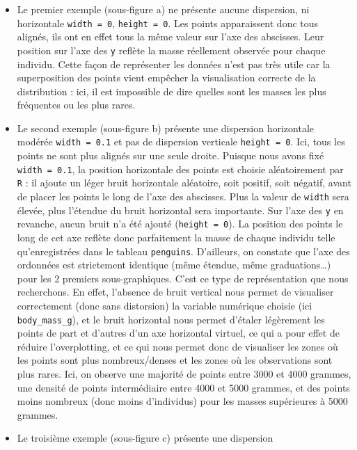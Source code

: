 \documentclass[
  letterpaper,
  DIV=11,
  numbers=noendperiod]{scrreprt}
\begin{document}
\begin{itemize}
\item
  Le premier exemple (sous-figure a) ne présente aucune dispersion, ni
  horizontale \texttt{width\ =\ 0}, \texttt{height\ =\ 0}. Les points
  apparaissent donc tous alignés, ils ont en effet tous la même valeur
  sur l'axe des abscisses. Leur position sur l'axe des \texttt{y}
  reflète la masse réellement observée pour chaque individu. Cette façon
  de représenter les données n'est pas très utile car la superposition
  des points vient empêcher la visualisation correcte de la distribution
  : ici, il est impossible de dire quelles sont les masses les plus
  fréquentes ou les plus rares.
\item
  Le second exemple (sous-figure b) présente une dispersion horizontale
  modérée \texttt{width\ =\ 0.1} et pas de dispersion verticale
  \texttt{height\ =\ 0}. Ici, tous les points ne sont plus alignés sur
  une seule droite. Puisque nous avons fixé \texttt{width\ =\ 0.1}, la
  position horizontale des points est choisie aléatoirement par
  \texttt{R} : il ajoute un léger bruit horizontale aléatoire, soit
  positif, soit négatif, avant de placer les points le long de l'axe des
  abscisses. Plus la valeur de \texttt{width} sera élevée, plus
  l'étendue du bruit horizontal sera importante. Sur l'axe des
  \texttt{y} en revanche, aucun bruit n'a été ajouté
  (\texttt{height\ =\ 0}). La position des points le long de cet axe
  reflète donc parfaitement la masse de chaque individu telle
  qu'enregistrées dans le tableau \texttt{penguins}. D'ailleurs, on
  constate que l'axe des ordonnées est strictement identique (même
  étendue, même graduations\ldots) pour les 2 premiers sous-graphiques.
  C'est ce type de représentation que nous recherchons. En effet,
  l'absence de bruit vertical nous permet de visualiser correctement
  (donc sans distorsion) la variable numérique choisie (ici
  \texttt{body\_mass\_g}), et le bruit horizontal nous permet d'étaler
  légèrement les points de part et d'autres d'un axe horizontal virtuel,
  ce qui a pour effet de réduire l'overplotting, et ce qui nous permet
  donc de visualiser les zones où les points sont plus nombreux/denses
  et les zones où les observations sont plus rares. Ici, on observe une
  majorité de points entre 3000 et 4000 grammes, une densité de points
  intermédiaire entre 4000 et 5000 grammes, et des points moins nombreux
  (donc moins d'individus) pour les masses supérieures à 5000 grammes.
\item
  Le troisième exemple (sous-figure c) présente une dispersion

\end{itemize}
\end{document}
